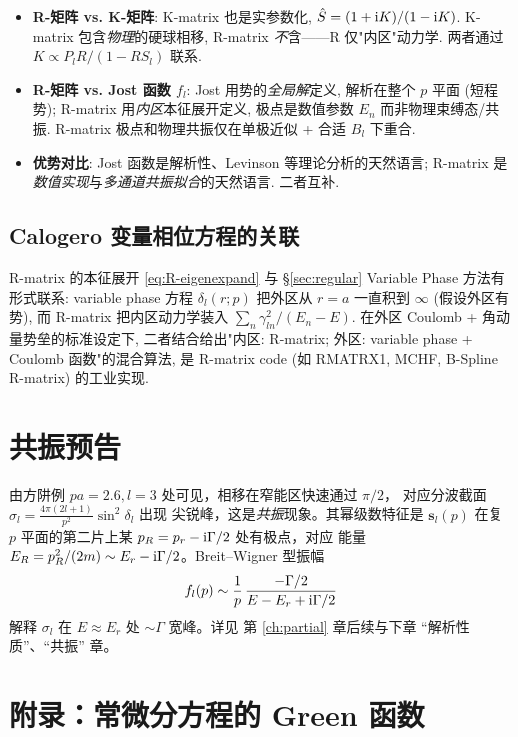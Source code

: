 \begin{itemize}
  \item \textbf{R-矩阵 vs. K-矩阵}: K-matrix 也是实参数化, $\hat{S}=(1+\mathrm{i} K)/(1-\mathrm{i} K)$. K-matrix 包含\emph{物理}的硬球相移, R-matrix \emph{不}含——R 仅"内区"动力学. 两者通过 $K\propto P_l R/(1-R S_l)$ 联系.
  \item \textbf{R-矩阵 vs. Jost 函数 $f_l$}: Jost 用势的\emph{全局解}定义, 解析在整个 $p$ 平面 (短程势); R-matrix 用\emph{内区}本征展开定义, 极点是数值参数 $E_n$ 而非物理束缚态/共振. R-matrix 极点和物理共振仅在单极近似 + 合适 $B_l$ 下重合.
  \item \textbf{优势对比}: Jost 函数是解析性、Levinson 等理论分析的天然语言; R-matrix 是\emph{数值实现}与\emph{多通道共振拟合}的天然语言. 二者互补.
\end{itemize}

\subsection{Calogero 变量相位方程的关联}\label{sec:Rmatrix-calogero}

R-matrix 的本征展开 \eqref{eq:R-eigenexpand} 与 \S\ref{sec:regular} Variable Phase 方法有形式联系: variable phase 方程 $\delta_l(r;p)$ 把外区从 $r=a$ 一直积到 $\infty$ (假设外区有势), 而 R-matrix 把内区动力学装入 $\sum_n \gamma_{ln}^2/(E_n-E)$. 在外区 Coulomb + 角动量势垒的标准设定下, 二者结合给出"内区: R-matrix; 外区: variable phase + Coulomb 函数"的混合算法, 是 R-matrix code (如 RMATRX1, MCHF, B-Spline R-matrix) 的工业实现.

\section{共振预告}\label{sec:resonance-preview}

由方阱例 $pa=2.6,l=3$ 处可见，相移在窄能区快速通过 $\pi/2$，
对应分波截面 $\sigma_l=\frac{4\pi(2l+1)}{p^2}\sin^2\delta_l$ 出现
尖锐峰，这是\emph{共振}现象。其幂级数特征是 $\mathbf s_l(p)$
在复 $p$ 平面的第二片上某 $p_R=p_r-\mathrm{i}\Gamma/2$ 处有极点，对应
能量 $E_R=p_R^2/(2m)\sim E_r-\mathrm{i}\Gamma/2$。Breit--Wigner 型振幅
\[
f_l(p)\sim \frac{1}{p}\,\frac{-\Gamma/2}{E-E_r+\mathrm{i}\Gamma/2}
\]
解释 $\sigma_l$ 在 $E\approx E_r$ 处 $\sim\Gamma$ 宽峰。详见
第 \ref{ch:partial} 章后续与下章 “解析性质”、“共振” 章。

\section*{附录：常微分方程的 Green 函数}\label{sec:appendix-Green}

